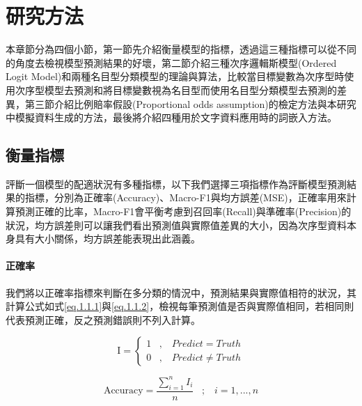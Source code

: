 %
\cleardoublepage
\thispagestyle{empty}
\setlength{\parindent}{2em}
\chapter{研究方法}
	本章節分為四個小節，第一節先介紹衡量模型的指標，透過這三種指標可以從不同的角度去檢視模型預測結果的好壞，第二節介紹三種次序邏輯斯模型(Ordered Logit Model)和兩種名目型分類模型的理論與算法，比較當目標變數為次序型時使用次序型模型去預測和將目標變數視為名目型而使用名目型分類模型去預測的差異，第三節介紹比例賠率假設(Proportional odds assumption)的檢定方法與本研究中模擬資料生成的方法，最後將介紹四種用於文字資料應用時的詞嵌入方法。
	
\section{衡量指標}
	評斷一個模型的配適狀況有多種指標，以下我們選擇三項指標作為評斷模型預測結果的指標，分別為正確率(Accuracy)、Macro-F1與均方誤差(MSE)，正確率用來計算預測正確的比率，Macro-F1會平衡考慮到召回率(Recall)與準確率(Precision)的狀況，均方誤差則可以讓我們看出預測值與實際值差異的大小，因為次序型資料本身具有大小關係，均方誤差能表現出此涵義。

\subsubsection{正確率}
	
	我們將以正確率指標來判斷在多分類的情況中，預測結果與實際值相符的狀況，其計算公式如式\ref{eq.1.1.1}與\ref{eq.1.1.2}，檢視每筆預測值是否與實際值相同，若相同則代表預測正確，反之預測錯誤則不列入計算。

\begin{equation}\label{eq.1.1.1}
\text{I} = \left\{
\begin{aligned}
\text{1}\;\;\; , \;\;\;Predict = Truth \\
\text{0}\;\;\; , \;\;\;Predict \neq Truth
\end{aligned}
\right.
\end{equation}

\begin{equation}\label{eq.1.1.2}
\text{Accuracy} = \frac{\sum_{i=1}^{n}I_i}{n} \;\;\;;\;\;\;  i=1,...,n
\end{equation}

